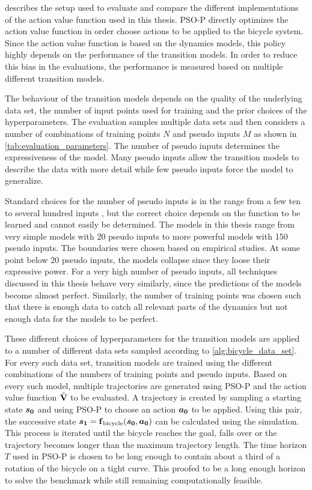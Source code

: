  describes the setup used to evaluate and compare the different implementations of the action value function used in this thesis.
PSO-P directly optimizes the action value function in order choose actions to be applied to the bicycle system.
Since the action value function is based on the dynamics models, this policy highly depends on the performance of the transition models.
In order to reduce this bias in the evaluations, the performance is measured based on multiple different transition models.

The behaviour of the transition models depends on the quality of the underlying data set, the number of input points used for training and the prior choices of the hyperparameters.
The evaluation samples multiple data sets and then considers a number of combinations of training points $N$ and pseudo inputs $M$ as shown in \cref{tab:evaluation_parameters}.
The number of pseudo inputs determines the expressiveness of the model.
Many pseudo inputs allow the transition models to describe the data with more detail while few pseudo inputs force the model to generalize.

Standard choices for the number of pseudo inputs is in the range from a few ten to several hundred inputs \cite{snelson_flexible_2007}, but the correct choice depends on the function to be learned and cannot easily be determined.
The models in this thesis range from very simple models with 20 pseudo inputs to more powerful models with 150 pseudo inputs.
The boundaries were chosen based on empirical studies.
At some point below 20 pseudo inputs, the models collapse since they loose their expressive power.
For a very high number of pseudo inputs, all techniques discussed in this thesis behave very similarly, since the predictions of the models become almost perfect.
Similarly, the number of training points was chosen such that there is enough data to catch all relevant parts of the dynamics but not enough data for the models to be perfect.

These different choices of hyperparameters for the transition models are applied to a number of different data sets sampled according to \cref{alg:bicycle_data_set}.
For every such data set, transition models are trained using the different combinations of the numbers of training points and pseudo inputs.
Based on every such model, multiple trajectories are generated using PSO-P and the action value function $\operatorname{\hat{\operatorname{\mathbf{V}}}}$ to be evaluated.
A trajectory is created by sampling a starting state $\bm{s_0}$ and using PSO-P to choose an action $\bm{a_0}$ to be applied.
Using this pair, the successive state $\bm{s_1} = \operatorname{\operatorname{\mathbf{f}}_{\text{bicycle}}}(\bm{s_0}, \bm{a_0})$ can be calculated using the simulation.
This process is iterated until the bicycle reaches the goal, falls over or the trajectory becomes longer than the maximum trajectory length.
The time horizon $T$ used in PSO-P is chosen to be long enough to contain about a third of a rotation of the bicycle on a tight curve.
This proofed to be a long enough horizon to solve the benchmark while still remaining computationally feasible.

